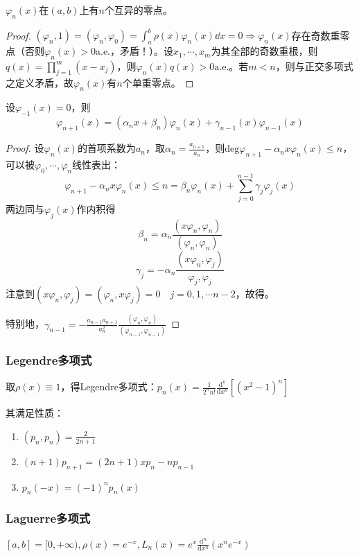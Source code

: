 \documentclass{ctexart}
\begin{document}
\begin{Thm}
$\varphi_n(x)$在$(a,b)$上有$n$个互异的零点。
\end{Thm}

\begin{proof}
$(\varphi_n,1)=(\varphi_n,\varphi_0)=\int_a^b\rho(x)\varphi_n(x)\dd x=0\Rightarrow \varphi_n(x)$存在奇数重零点（否则$\varphi_n(x)>0 \mathrm{a.e.}$，矛盾！）。设$x_1,\cdots,x_m$为其全部的奇数重根，则$q(x)=\prod\limits_{j=1}^m(x-x_j)$，则$\varphi_n(x)q(x)>0 \mathrm{a.e.}$。若$m<n$，则与正交多项式之定义矛盾，故$\varphi_n(x)$有$n$个单重零点。
\end{proof}

\begin{Thm}
设$\varphi_{-1}(x)=0$，则
\[\varphi_{n+1}(x)=(\alpha_n x+\beta_n)\varphi_n(x)+\gamma_{n-1}(x)\varphi_{n-1}(x)\]
\end{Thm}

\begin{proof}
设$\varphi_n(x)$的首项系数为$a_n$，取$\alpha_n=\frac{a_{n+1}}{a_n}$，则$\mathrm{deg} \varphi_{n+1}-\alpha_n x\varphi_n(x)\leq n$，可以被$\varphi_0,\cdots,\varphi_n$线性表出：
\[\varphi_{n+1}-\alpha_n x\varphi_n(x)\leq n=\beta_n\varphi_n(x)+\sum_{j=0}^{n-1}\gamma_j\varphi_j(x)\]
两边同与$\varphi_j(x)$作内积得
\[\beta_n=\alpha_n\frac{(x\varphi_n,\varphi_n)}{(\varphi_n,\varphi_n)}\]
\[\gamma_j=-\alpha_n\frac{(x\varphi_n,\varphi_j)}{\varphi_j,\varphi_j}\]
注意到$(x\varphi_n,\varphi_j)=(\varphi_n,x\varphi_j)=0\quad j=0,1,\cdots n-2$，故得。

特别地，$\gamma_{n-1}=-\frac{a_{n-1}a_{n+1}}{a_n^2}\frac{(\varphi_n,\varphi_n)}{(\varphi_{n-1},\varphi_{n-1})}$
\end{proof}

\subsubsection{Legendre多项式}
取$\rho(x)\equiv 1$，得Legendre多项式：$p_n(x)=\frac{1}{2^nn!}\frac{\mathrm{d}^n}{\mathrm{d}x^n}[(x^2-1)^n]$

其满足性质：
\begin{enumerate}
\item $(p_n,p_n)=\frac{2}{2n+1}$
\item $(n+1)p_{n+1}=(2n+1)xp_n-np_{n-1}$
\item $p_n(-x)=(-1)^n p_n(x)$
\end{enumerate}

\subsubsection{Laguerre多项式}
$[a,b]=[0,+\infty),\rho(x)=e^{-x},L_n(x)=e^x\frac{\mathrm{d}^n}{\mathrm{d}x^n}(x^n e^{-x})$
\end{document}
